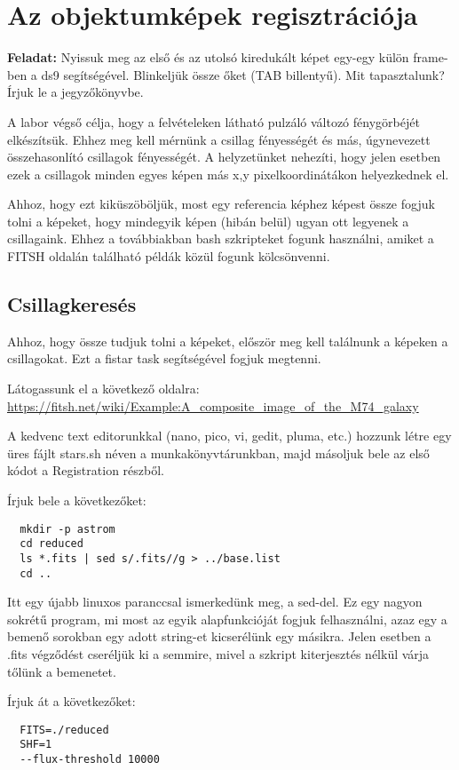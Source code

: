 \documentclass{article}
\begin{document}
\section{Az objektumképek regisztrációja}

{\bf Feladat:}
Nyissuk meg az első és az utolsó kiredukált képet egy-egy külön frame-ben a ds9
segítségével. Blinkeljük össze őket (TAB billentyű). Mit tapasztalunk? Írjuk le
a jegyzőkönyvbe.

A labor végső célja, hogy a felvételeken látható pulzáló változó fénygörbéjét
elkészítsük. Ehhez meg kell mérnünk a csillag fényességét és más, úgynevezett
összehasonlító csillagok fényességét. A helyzetünket nehezíti, hogy jelen
esetben ezek a csillagok minden egyes képen más x,y pixelkoordinátákon
helyezkednek el.

Ahhoz, hogy ezt kiküszöböljük, most egy referencia képhez képest össze fogjuk
tolni a képeket, hogy mindegyik képen (hibán belül) ugyan ott legyenek a
csillagaink. Ehhez a továbbiakban bash szkripteket fogunk használni, amiket a
FITSH oldalán található példák közül fogunk kölcsönvenni.

\subsection{Csillagkeresés}

Ahhoz, hogy össze tudjuk tolni a képeket, először meg kell találnunk a képeken a
csillagokat. Ezt a fistar task segítségével fogjuk megtenni.

Látogassunk el a következő oldalra:
\url{https://fitsh.net/wiki/Example:A_composite_image_of_the_M74_galaxy}

A kedvenc text editorunkkal (nano, pico, vi, gedit, pluma, etc.) hozzunk létre
egy üres fájlt stars.sh néven a munkakönyvtárunkban, majd másoljuk bele az első
kódot a Registration részből.

Írjuk bele a következőket:
\begin{verbatim}
  mkdir -p astrom
  cd reduced
  ls *.fits | sed s/.fits//g > ../base.list
  cd ..
\end{verbatim}

Itt egy újabb linuxos paranccsal ismerkedünk meg, a sed-del. Ez egy nagyon
sokrétű program, mi most az egyik alapfunkcióját fogjuk felhasználni, azaz egy
a bemenő sorokban egy adott string-et kicserélünk egy másikra. Jelen esetben a
.fits végződést cseréljük ki a semmire, mivel a szkript kiterjesztés nélkül
várja tőlünk a bemenetet.

Írjuk át a következőket:
\begin{verbatim}
  FITS=./reduced
  SHF=1
  --flux-threshold 10000
\end{verbatim}
\end{document}
